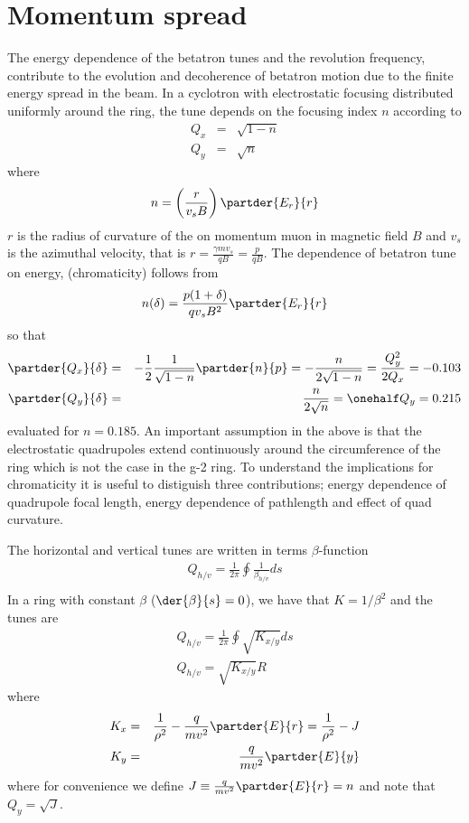 \section{Momentum spread}
The energy dependence of the betatron tunes and the revolution frequency, contribute to the evolution 
and decoherence of betatron motion due to the finite energy spread in the beam.
In a cyclotron with electrostatic focusing
distributed uniformly around the ring,
the tune depends on the focusing index $n$ according to
\begin{eqnarray*}
Q_x &=& \sqrt{1-n}\\
Q_y &=& \sqrt{n}
\end{eqnarray*}
where $$n =\left(\frac{r}{v_s B}\right)\partder{E_r}{r}$$
$r$ is the radius of curvature of the on momentum muon in magnetic field $B$ and $v_s$ is the azimuthal
velocity, that is $r = \frac{\gamma m v_s}{q B} = \frac{p}{qB}$.
The dependence of betatron tune on energy, (chromaticity) follows from
$$n(\delta) = \frac{p(1+\delta)}{qv_s B^2}\partder{E_r}{r}$$ so
that
\begin{eqnarray*}
\partder{Q_x}{\delta} &=&-\frac{1}{2}\frac{1}{ \sqrt{1-n}}\partder{n}{p} = -\frac{n}{2\sqrt{1-n}} = \frac{Q_y^2}{2Q_x} =-0.103\\
\partder{Q_y}{\delta} &=& \frac{n}{2\sqrt{n}}=\onehalf Q_y = 0.215 
\end{eqnarray*}
evaluated for $n=0.185$.
An important assumption in the above is that the electrostatic quadrupoles extend continuously around the circumference of the ring
which is not the case in the g-2 ring. To understand the implications for chromaticity it is useful to 
distiguish three contributions; energy dependence of quadrupole focal length, energy dependence of pathlength
and effect of quad curvature.

The horizontal and vertical tunes are written in terms $\beta$-function
\begin{eqnarray}
Q_{h/v} = \frac{1}{2\pi}\oint \frac{1}{\beta_{h/v}} ds\nonumber\\
\end{eqnarray}
In a ring with constant $\beta$ ($\der{\beta}{s}=0$), we have that $K=1/\beta^2$ and the tunes are
\begin{eqnarray}
Q_{h/v} = \frac{1}{2\pi}\oint  \sqrt{K_{x/y}} ds \nonumber\\
Q_{h/v} =  \sqrt{K_{x/y}} R \label{eq:tunechrom}
\end{eqnarray}
where 
\begin{eqnarray*}
K_x &=& \frac{1}{\rho^2} - \frac{q}{mv^2}\partder{E}{r} = \frac{1}{\rho^2}-J\\
K_y &=& \frac{q}{mv^2}\partder{E}{y}\\
\end{eqnarray*}
where for convenience we define $J \equiv \frac{q}{mv^2}\partder{E}{r}=n$ and note that $Q_y = \sqrt{J}$.

